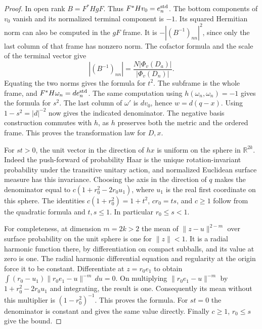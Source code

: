 \documentclass[a4paper,11pt]{article}
\theoremstyle{definition}
\theoremstyle{remark}
\numberwithin{equation}{section}
\begin{document}
\begin{proof}
In open rank \(B=F^*HgF\). Thus \(F^*Hv_0=e_n^{\rm std}\).
The bottom components of \(v_0\) vanish and its normalized
terminal component is \(-1\). Its squared Hermitian norm
can also be computed in the \(gF\) frame. It is
\(-|(B^{-1})_{nn}|^2\), since only the last column of that
frame has nonzero norm. The cofactor formula and the scale
of the terminal vector give
\[
            |(B^{-1})_{nn}|=
                 \frac{N|\Phi_v(D_a)|}{|\Phi_v(D_n)|}.
\]
Equating the two norms gives the formula for \(t^2\).
The subframe is the whole frame, and \(F^*H\omega_n=d e_n^{\rm std}\).
The same computation using \(h(\omega_n,\omega_n)=-1\)
gives the formula for \(s^2\). The last column of \(\omega'\)
is \(dv_0\), hence \(w=d(q-x)\). Using \(1-s^2=|d|^{-2}\)
now gives the indicated denominator. The negative basis
construction commutes with \(h\), as \(h\) preserves both the
metric and the ordered frame. This proves the transformation
law for \(D,x\).

For \(st>0\), the unit vector in the direction of \(hx\) is
uniform on the sphere in \(\mathbb R^{2k}\). Indeed the
push-forward of probability Haar is the unique rotation-invariant
probability under the transitive unitary action, and normalized
Euclidean surface measure has this invariance. Choosing the
axis in the direction of \(q\) makes the denominator equal to
\(c(1+r_0^2-2r_0 u_1)\), where \(u_1\) is the real first
coordinate on this sphere. The identities
\(c(1+r_0^2)=1+t^2\), \(cr_0=ts\), and \(c\ge1\) follow from
the quadratic formula and \(t,s\le1\). In particular
\(r_0\le s<1\).

For completeness, at dimension \(m=2k>2\) the mean of
\(\|z-u\|^{2-m}\) over surface probability on the unit sphere
is one for \(\|z\|<1\). It is a radial harmonic function there,
by differentiation on compact subballs, and its value at zero
is one. The radial harmonic differential equation and regularity
at the origin force it to be constant. Differentiate at
\(z=r_0 e_1\) to obtain
\(\int (r_0-u_1)\|r_0 e_1-u\|^{-m}\,du=0\).
On multiplying \(\|r_0 e_1-u\|^{-m}\) by
\(1+r_0^2-2r_0u_1\) and integrating, the result is one.
Consequently its mean without this multiplier is
\((1-r_0^2)^{-1}\). This proves the formula. For \(st=0\)
the denominator is constant and gives the same value directly.
Finally \(c\ge1\), \(r_0\le s\) give the bound.
\end{proof}
\end{document}

